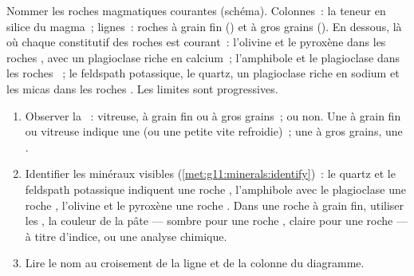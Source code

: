 \begin{omfigure}
{\small Nommer les roches magmatiques courantes (schéma). Colonnes~: la
teneur en silice du magma~; lignes~: roches à grain fin () et à
gros grains (). En dessous, là où chaque  constitutif
des roches est courant~: l'olivine et le pyroxène dans les roches ,
avec un plagioclase riche en calcium~; l'amphibole et le plagioclase dans
les roches ~; le feldspath potassique, le quartz, un
plagioclase riche en sodium et les micas dans les roches . Les
limites sont progressives.}
\end{omfigure}

\begin{method}\label{met:g11:igneous-rocks:naming}
\begin{enumerate}
  \item Observer la ~: vitreuse, à grain fin ou à gros grains~;
         ou non. Une  à grain fin ou vitreuse indique une
         (ou une petite  vite refroidie)~; une
         à gros grains, une .
  \item Identifier les minéraux visibles
        (\cref{met:g11:minerals:identify})~: le quartz et le feldspath
        potassique indiquent une roche , l'amphibole avec le
        plagioclase une roche , l'olivine et le pyroxène une
        roche . Dans une roche à grain fin, utiliser les
        , la couleur de la pâte --- sombre pour une roche
        , claire pour une roche  --- à titre d'indice, ou
        une analyse chimique.
  \item Lire le nom au croisement de la ligne et de la colonne du
        diagramme.
\end{enumerate}
\end{method}

